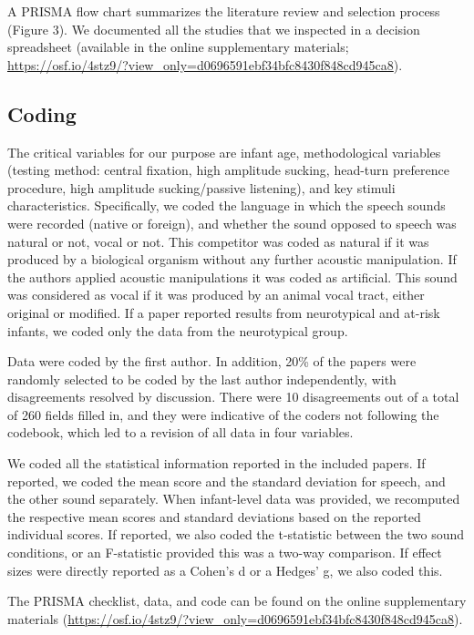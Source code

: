 \documentclass[man]{apa6}
\begin{document}
A PRISMA flow chart summarizes the literature review and selection
process (Figure 3). We documented all the studies that we inspected in a
decision spreadsheet (available in the online supplementary materials;
\url{https://osf.io/4stz9/?view_only=d0696591ebf34bfc8430f848cd945ca8}).

\subsection{Coding}\label{coding}

The critical variables for our purpose are infant age, methodological
variables (testing method: central fixation, high amplitude sucking,
head-turn preference procedure, high amplitude sucking/passive
listening), and key stimuli characteristics. Specifically, we coded the
language in which the speech sounds were recorded (native or foreign),
and whether the sound opposed to speech was natural or not, vocal or
not. This competitor was coded as natural if it was produced by a
biological organism without any further acoustic manipulation. If the
authors applied acoustic manipulations it was coded as artificial. This
sound was considered as vocal if it was produced by an animal vocal
tract, either original or modified. If a paper reported results from
neurotypical and at-risk infants, we coded only the data from the
neurotypical group.

Data were coded by the first author. In addition, 20\% of the papers
were randomly selected to be coded by the last author independently,
with disagreements resolved by discussion. There were 10 disagreements
out of a total of 260 fields filled in, and they were indicative of the
coders not following the codebook, which led to a revision of all data
in four variables.

We coded all the statistical information reported in the included
papers. If reported, we coded the mean score and the standard deviation
for speech, and the other sound separately. When infant-level data was
provided, we recomputed the respective mean scores and standard
deviations based on the reported individual scores. If reported, we also
coded the t-statistic between the two sound conditions, or an
F-statistic provided this was a two-way comparison. If effect sizes were
directly reported as a Cohen's d or a Hedges' g, we also coded this.

The PRISMA checklist, data, and code can be found on the online
supplementary materials
(\url{https://osf.io/4stz9/?view_only=d0696591ebf34bfc8430f848cd945ca8}).
\end{document}

